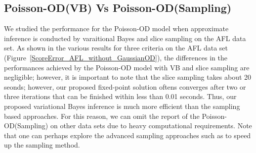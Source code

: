 \subsection{Poisson-OD(VB) Vs Poisson-OD(Sampling)}
\label{sec:VBSampling}
We studied the performance for the Poisson-OD model when approximate inference is conducted by varaitional Bayes and slice sampling on the AFL data set. As shown in the various results for three criteria on the AFL data set (Figure~\ref{ScoreError_AFL_without_GaussianOD}), the differences in the performances achieved by the Poisson-OD model with VB and slice sampling are negligible; however, it is important to note that the slice sampling takes about 20 seonds; however, our proposed fixed-point solution oftens converges after two or three iterations that can be finished within less  than 0.01 seconds. Thus, our proposed variational Bayes inference is much more efficient than the sampling based approaches. For this reason, we can omit the report of the Poisson-OD(Sampling) on other data sets due to heavy computational requirements. Note that one can perhaps explore the advanced sampling approaches such as \cite{Murray:AISTATS2010} to speed up the sampling method. 


